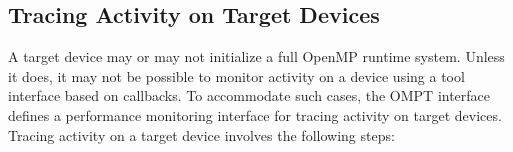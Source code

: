 \begin{comment}
\item \code{ompt\_callback\_sync\_region}, see \specref
\item \code{ompt\_callback\_init\_lock}, see \specref
\item \code{ompt\_callback\_destroy\_lock}, see \specref
\item \code{ompt\_callback\_mutex\_acquire}, see \specref
\item \code{ompt\_callback\_mutex\_acquired}, see \specref
\item \code{ompt\_callback\_nest\_lock}, see ...
\item \code{ompt\_callback\_flush}, see \specref{subsec:flush Construct}.
\item \code{ompt\_callback\_cancel}, see \specref{sec:Cancellation Constructs}.
\end{itemize}
\end{comment}


\subsection{Tracing Activity on Target Devices}
\label{sec:tracing-device-activity}

A target device may or may not initialize a full OpenMP runtime system.
Unless it does, it may not be possible to monitor activity 
on a device using a tool interface based on callbacks.
To accommodate such cases, the OMPT interface defines 
a performance monitoring interface for tracing activity on target
devices. Tracing activity on a target device involves the following
steps:

